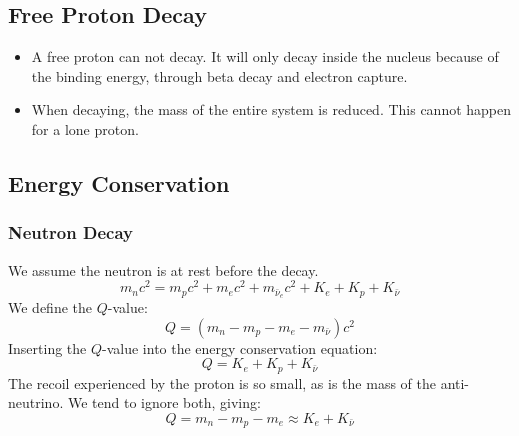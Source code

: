 \vspace{10mm}
\subsection{Free Proton Decay}
\begin{itemize}
    \item A free proton can not decay. It will only decay inside the nucleus because of the binding energy, through beta decay and electron capture. 
    \item When decaying, the mass of the entire system is reduced. This cannot happen for a lone proton. 
\end{itemize}

\subsection{Energy Conservation}
\subsubsection{Neutron Decay}

We assume the neutron is at rest before the decay. 
\begin{equation}
    m_nc^2 = m_pc^2 + m_ec^2 + m_{\bar{\nu}_e}c^2 + K_{e} + K_{p} + K_{\bar{ν}}
\end{equation}
We define the $Q$-value:
\begin{equation}
    Q = \left(m_n - m_p - m_e - m_{\bar{ν}}\right)c^2
\end{equation}
Inserting the $Q$-value into the energy conservation equation:
\begin{equation}
    Q = K_{e} + K_{p} + K_{\bar{ν}}
\end{equation}
The recoil experienced by the proton is so small, as is the mass of the anti-neutrino. We tend to ignore both, giving:
\begin{equation}
    Q = m_n - m_p - m_e ≈ K_{e} + K_{\bar{ν}}
\end{equation}


